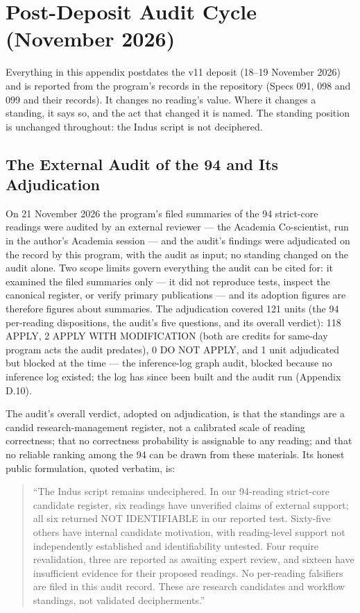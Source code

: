 \documentclass[11pt]{article}
\begin{document}
\section{Post-Deposit Audit Cycle (November
2026)}\label{appendix-d-post-deposit-audit-cycle}

Everything in this appendix postdates the v11 deposit (18--19
November 2026) and is reported from the program's records in the
repository (Specs 091, 098 and 099 and their records). It changes
no reading's value. Where it changes a standing, it says so, and
the act that changed it is named. The standing position is
unchanged throughout: the Indus script is not deciphered.

\subsection{The External Audit of the 94 and Its
Adjudication}\label{appendix-d1-external-audit}

On 21 November 2026 the program's filed summaries of the 94
strict-core readings were audited by an external reviewer --- the
Academia Co-scientist, run in the author's Academia session ---
and the audit's findings were adjudicated on the record by this
program, with the audit as input; no standing changed on the
audit alone. Two scope limits govern everything the audit can be
cited for: it examined the filed summaries only --- it did not
reproduce tests, inspect the canonical register, or verify
primary publications --- and its adoption figures are therefore
figures about summaries. The adjudication covered 121 units (the
94 per-reading dispositions, the audit's five questions, and its
overall verdict): 118 APPLY, 2 APPLY WITH MODIFICATION (both are
credits for same-day program acts the audit predates), 0 DO NOT
APPLY, and 1 unit adjudicated but blocked at the time --- the
inference-log graph audit, blocked because no inference log
existed; the log has since been built and the audit run
(Appendix D.10).

The audit's overall verdict, adopted on adjudication, is that
the standings are a candid research-management register, not a
calibrated scale of reading correctness; that no correctness
probability is assignable to any reading; and that no reliable
ranking among the 94 can be drawn from these materials. Its
honest public formulation, quoted verbatim, is:

\begin{quote}
``The Indus script remains undeciphered. In our 94-reading
strict-core candidate register, six readings have unverified
claims of external support; all six returned NOT IDENTIFIABLE in
our reported test. Sixty-five others have internal candidate
motivation, with reading-level support not independently
established and identifiability untested. Four require
revalidation, three are reported as awaiting expert review, and
sixteen have insufficient evidence for their proposed readings.
No per-reading falsifiers are filed in this audit record. These
are research candidates and workflow standings, not validated
decipherments.''
\end{quote}
\end{document}
